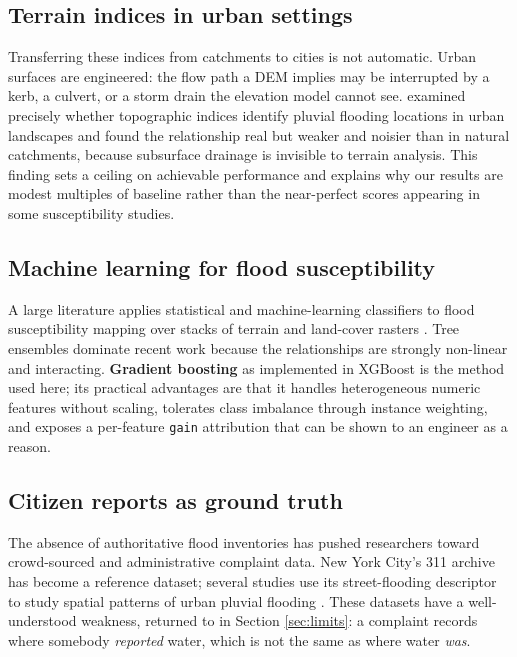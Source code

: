 \documentclass[11pt,a4paper]{article}
\newcommand{\ttt}[1]{\texttt{#1}}
\begin{document}
\subsection{Terrain indices in urban settings}
Transferring these indices from catchments to cities is not automatic. Urban surfaces are
engineered: the flow path a DEM implies may be interrupted by a kerb, a culvert, or a
storm drain the elevation model cannot see. \citet{kelleher2020} examined precisely
whether topographic indices identify pluvial flooding locations in urban landscapes and
found the relationship real but weaker and noisier than in natural catchments, because
subsurface drainage is invisible to terrain analysis. This finding sets a ceiling on
achievable performance and explains why our results are modest multiples of baseline
rather than the near-perfect scores appearing in some susceptibility studies.

\subsection{Machine learning for flood susceptibility}
A large literature applies statistical and machine-learning classifiers to flood
susceptibility mapping over stacks of terrain and land-cover rasters
\citep{tehrany2014,dano2019}. Tree ensembles dominate recent work because the
relationships are strongly non-linear and interacting. \textbf{Gradient boosting} as
implemented in XGBoost \citep{chen2016xgboost} is the method used here; its practical
advantages are that it handles heterogeneous numeric features without scaling, tolerates
class imbalance through instance weighting, and exposes a per-feature \ttt{gain}
attribution that can be shown to an engineer as a reason.

\subsection{Citizen reports as ground truth}
The absence of authoritative flood inventories has pushed researchers toward
crowd-sourced and administrative complaint data. New York City's 311 archive has become
a reference dataset; several studies use its street-flooding descriptor to study spatial
patterns of urban pluvial flooding \citep{agonafir2022understanding,agonafir2022ml}.
These datasets have a well-understood weakness, returned to in Section \ref{sec:limits}:
a complaint records where somebody \emph{reported} water, which is not the same as where
water \emph{was}.
\end{document}
